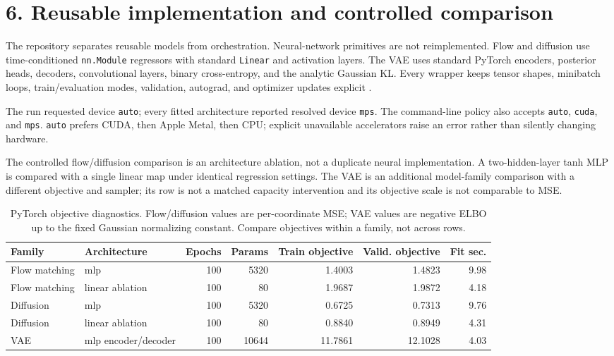 \documentclass[11pt]{article}
\newcommand{\code}[1]{\texttt{#1}}
\begin{document}
\section*{6. Reusable implementation and controlled comparison}

The repository separates reusable models from orchestration. Neural-network
primitives are not reimplemented. Flow and diffusion use time-conditioned
\code{nn.Module} regressors with standard \code{Linear} and activation layers.
The VAE uses standard PyTorch encoders, posterior heads, decoders, convolutional
layers, binary cross-entropy, and the analytic Gaussian KL. Every wrapper keeps
tensor shapes, minibatch loops, train/evaluation modes, validation, autograd, and
optimizer updates explicit \cite{pytorchDocs}.

The run requested device \code{auto}; every fitted architecture
reported resolved device \code{mps}. The command-line policy also
accepts \code{auto}, \code{cuda}, and \code{mps}. \code{auto} prefers
CUDA, then Apple Metal, then CPU; explicit unavailable accelerators raise an
error rather than silently changing hardware.

The controlled flow/diffusion comparison is an architecture ablation, not a
duplicate neural implementation. A two-hidden-layer tanh MLP is compared with a
single linear map under identical regression settings. The VAE is an additional
model-family comparison with a different objective and sampler; its row is not a
matched capacity intervention and its objective scale is not comparable to MSE.

\begin{table}[H]
\centering
\small
\begin{tabular}{llrrrrr}
\toprule
Family & Architecture & Epochs & Params & Train objective & Valid. objective & Fit sec. \\
\midrule
Flow matching & mlp & 100 & 5320 & 1.4003 & 1.4823 & 9.98 \\
Flow matching & linear ablation & 100 & 80 & 1.9687 & 1.9872 & 4.18 \\
Diffusion & mlp & 100 & 5320 & 0.6725 & 0.7313 & 9.76 \\
Diffusion & linear ablation & 100 & 80 & 0.8840 & 0.8949 & 4.31 \\
VAE & mlp encoder/decoder & 100 & 10644 & 11.7861 & 12.1028 & 4.03 \\
\bottomrule
\end{tabular}
\caption{PyTorch objective diagnostics. Flow/diffusion values are
per-coordinate MSE; VAE values are negative ELBO up to the fixed Gaussian
normalizing constant. Compare objectives within a family, not across rows.}
\end{table}
\end{document}
